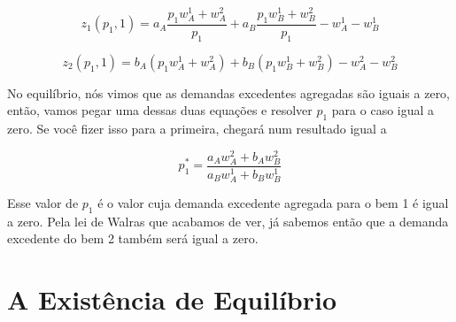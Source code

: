 \documentclass[a4paper,11pt,oneside]{book}
\theoremstyle{definition}
\theoremstyle{break}
\begin{document}
$$z_1(p_1,1) = 
a_A \frac{p_1w_A^1 + w_A^2}{p_1} + 
a_B \frac{p_1w_B^1 + w_B^2}{p_1} - w_A^1 - w_B^1$$

$$z_2(p_1,1) = 
b_A (p_1w_A^1 + w_A^2) + 
b_B (p_1w_B^1 + w_B^2) - w_A^2 - w_B^2$$

No equilíbrio, nós vimos que as demandas excedentes agregadas são iguais a zero, então, vamos pegar uma dessas duas equações e resolver $p_1$ para o caso igual a zero. Se você fizer isso para a primeira, chegará num resultado igual a

$$p_1^* = \frac{a_A w_A^2 + b_A w_B^2}{a_B w_A^1 + b_B w_B^1}$$

Esse valor de $p_1$ é o valor cuja demanda excedente agregada para o bem 1 é igual a zero. Pela lei de Walras que acabamos de ver, já sabemos então que a demanda excedente do bem 2 também será igual a zero.

\section{A Existência de Equilíbrio}
\end{document}
